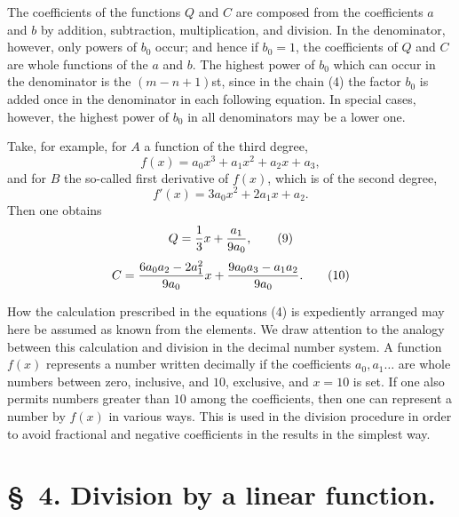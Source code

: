 \documentclass[11pt]{article}
\begin{document}
The coefficients of the functions $Q$ and $C$ are composed from the coefficients $a$ and $b$ by addition, subtraction, multiplication, and division. In the denominator, however, only powers of $b_0$ occur; and hence if $b_0=1$, the coefficients of $Q$ and $C$ are whole functions of the $a$ and $b$. The highest power of $b_0$ which can occur in the denominator is the $(m-n+1)$st, since in the chain (4) the factor $b_0$ is added once in the denominator in each following equation. In special cases, however, the highest power of $b_0$ in all denominators may be a lower one.

Take, for example, for $A$ a function of the third degree,
\begin{equation}
 f(x)=a_0x^3+a_1x^2+a_2x+a_3,
\tag{7}
\end{equation}
and for $B$ the so-called first derivative of $f(x)$, which is of the second degree,
\begin{equation}
 f'(x)=3a_0x^2+2a_1x+a_2.
\tag{8}
\end{equation}
Then one obtains
\begin{equation}
 Q={1\over 3}x+{a_1\over 9a_0},
\tag{9}
\end{equation}
\begin{equation}
 C={6a_0a_2-2a_1^2\over 9a_0}x+{9a_0a_3-a_1a_2\over 9a_0}.
\tag{10}
\end{equation}

How the calculation prescribed in the equations (4) is expediently arranged may here be assumed as known from the elements. We draw attention to the analogy between this calculation and division in the decimal number system. A function $f(x)$ represents a number written decimally if the coefficients $a_0,a_1\ldots$ are whole numbers between zero, inclusive, and $10$, exclusive, and $x=10$ is set. If one also permits numbers greater than $10$ among the coefficients, then one can represent a number by $f(x)$ in various ways. This is used in the division procedure in order to avoid fractional and negative coefficients in the results in the simplest way.

\section*{\S~4. Division by a linear function.}
\end{document}
